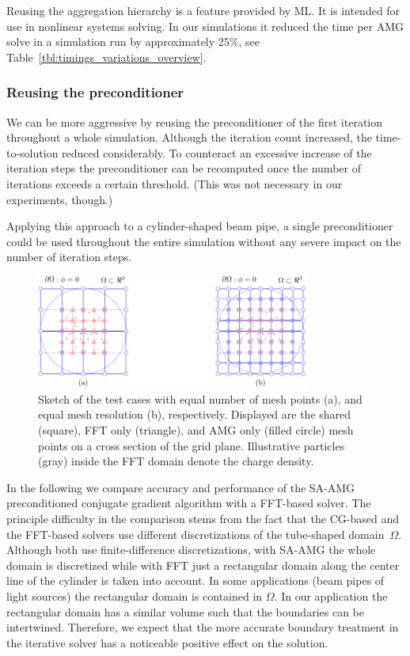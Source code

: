 \documentclass[a4paper,10pt,3p,preprint,pdftex]{elsarticle}
\begin{document}
Reusing the aggregation hierarchy is a feature provided by ML.  It is
intended for use in nonlinear systems solving.  In our simulations it
reduced the time per AMG solve in a simulation run by approximately
25\%, see Table~\ref{tbl:timings_variations_overview}.

\subsubsection*{Reusing the preconditioner}

We can be more aggressive by reusing the preconditioner of the first
iteration throughout a whole simulation.  Although the iteration count
increased, the time-to-solution reduced considerably.  To counteract an
excessive increase of the iteration steps the preconditioner can be
recomputed once the number of iterations exceeds a certain threshold.
(This was not necessary in our experiments, though.)

Applying this approach to a cylinder-shaped beam pipe, a single
preconditioner could be used throughout the entire simulation without
any severe impact on the number of iteration steps.

\begin{figure}[ht]
  \centering
  \includegraphics[width=0.8\textwidth]{figgrids.pdf}
  \centering
  \caption{Sketch of the test cases with equal number of mesh points
    (a), and equal mesh resolution (b), respectively.  Displayed are the
    shared (square), FFT only (triangle), and AMG only (filled circle) mesh
    points on a cross section of the grid plane.  Illustrative particles
    (gray) inside the FFT domain denote the charge density.}

  \label{fig:meshcmp}
\end{figure}

In the following we compare accuracy and performance of the
SA-AMG preconditioned conjugate gradient algorithm with a FFT-based
solver.  The principle difficulty in the comparison stems from the fact
that the CG-based and the FFT-based solvers use different
discretizations of the tube-shaped domain~$\Omega$.  Although both use
finite-difference discretizations, with SA-AMG the whole domain is
discretized while with FFT just a rectangular domain along the center
line of the cylinder is taken into account.  In some applications
(beam pipes of light sources) the rectangular domain is contained in $\Omega$.  In
our application the rectangular domain has a similar volume such that
the boundaries can be intertwined.  Therefore, we expect that the more
accurate boundary treatment in the iterative solver has a noticeable
positive effect on the solution.
\end{document}
